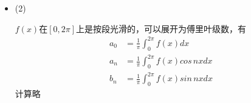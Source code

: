 \documentclass{article}
\begin{document}
\begin{itemize}
\begin{itemize}
\begin{align*}
                   & = \frac{1}{\pi} \int_{-\pi}^{\pi} f(x) sin\, nx dx \\
                   & = \frac{1}{\pi} \int_{-\pi}^{\pi} x^2 sin\, nx dx  \\
                   & = 0
                \end{align*}
                故
                \begin{align*}
                  f(x) & =  \frac{a_0}{2} + \sum\limits_{n = 1}^{\infty} a_n cos nx + b_n sin nx                                \\
                       & = \frac{(\pi)^2}{3} \sum\limits_{n = 1}^{\infty} (-1)^n \frac{4}{n^2} cos \, nx , \, x \in (-\pi, \pi)
                \end{align*}
                \textcolor{red}{注：}
                $x = \pm \pi$时，
                \begin{align*}
                  \frac{f(\pi + 0) + f(\pi - 0)}{2}
                  = \pi^2
                   & = \frac{\pi^2}{3} + \sum\limits_{n = 1}^{\infty} (-1)^n \frac{4}{n^2} cos \, n\pi \\
                   & = \frac{\pi^2}{3} + \sum\limits_{n = 1}^{\infty} \frac{4}{n^2}
                \end{align*}
                经过变形，我们有
                \begin{align*}
                  \frac{\pi^2}{6} & = \sum\limits_{n = 1}^{\infty} \frac{1}{n^2}
                \end{align*}

          \item (2)

                $f(x)$在$[0, 2\pi]$上是按段光滑的，可以展开为傅里叶级数，有
                \begin{align*}
                  a_0 & = \frac{1}{\pi} \int_{0}^{2\pi} f(x) dx          \\
                  a_n & = \frac{1}{\pi} \int_{0}^{2\pi} f(x) cos\, nx dx \\
                  b_n & = \frac{1}{\pi} \int_{0}^{2\pi} f(x) sin\, nx dx
                \end{align*}
                计算略

        \end{itemize}


\end{itemize}
\end{document}

